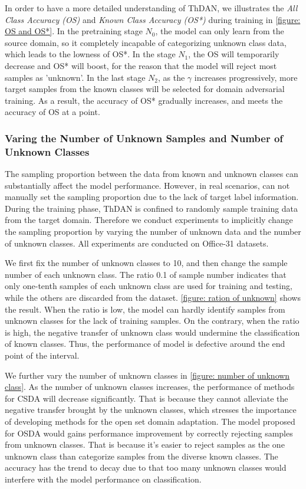 In order to have a more detailed understanding of ThDAN, we illustrates the \textit{All Class Accuracy (OS)} and \textit{Known Class Accuracy (OS*)} during training in \figurename{\ref{figure: OS and OS*}}. 
In the pretraining stage $N_0$, the model can only learn from the source domain, so it completely incapable of categorizing unknown class data, which leads to the lowness of OS*. 
In the stage $N_1$, the OS will temporarily decrease and OS* will boost, for the reason that the model will reject most samples as 'unknown'. 
In the last stage $N_2$, as the $\gamma$ increases progressively, more target samples from the known classes will be selected for domain adversarial training. As a result, the accuracy of OS* gradually increases, and meets the accuracy of OS at a point. 

\subsubsection{Varing the Number of Unknown Samples and Number of Unknown Classes}
The sampling proportion between the data from known and unknown classes can substantially affect the model performance.
However, in real scenarios, can not manually set the sampling proportion due to the lack of target label information.
During the training phase, ThDAN is confined to randomly sample training data from the target domain.
Therefore we conduct experiments to implicitly change the sampling proportion by varying the number of unknown data and the number of unknown classes.
All experiments are conducted on Office-31 datasets.

We first fix the number of unknown classes to 10, and then change the sample number of each unknown class.
The ratio 0.1 of sample number indicates that only one-tenth samples of each unknown class are used for training and testing, while the others are discarded from the dataset.
\figurename{\ref{figure: ration of unknown}} shows the result.
When the ratio is low, the model can hardly identify samples from unknown classes for the lack of training samples. 
On the contrary, when the ratio is high, the negative transfer of unknown class would undermine the classification of known classes. 
Thus, the performance of model is defective around the end point of the interval. 

We further vary the number of unknown classes in \figurename{\ref{figure: number of unknown class}}.
As the number of unknown classes increases, the performance of methods for CSDA will decrease significantly. 
That is because they cannot alleviate the negative transfer brought by the unknown classes, which stresses the importance of developing methods for the open set domain adaptation. 
The model proposed for OSDA would gains performance improvement by correctly rejecting samples from unknown classes. 
That is because it's easier to reject samples as the one unknown class than categorize samples from the diverse known classes.  
The accuracy has the trend to decay due to that too many unknown classes would interfere with the model performance on classification.


